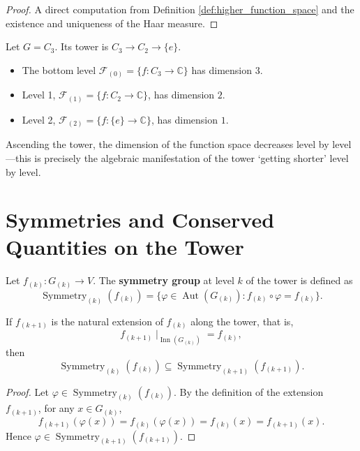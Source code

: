 \begin{proof}
A direct computation from Definition \ref{def:higher_function_space} and the existence and uniqueness of the Haar measure.
\end{proof}

\begin{example}\label{ex:c3_tower_functions}
Let $G=C_3$. Its tower is $C_3\to C_2\to\{e\}$.
\begin{itemize}
    \item The bottom level $\mathcal{F}_{(0)} = \{f: C_3\to\mathbb{C}\}$ has dimension $3$.
    \item Level 1, $\mathcal{F}_{(1)} = \{f: C_2\to\mathbb{C}\}$, has dimension $2$.
    \item Level 2, $\mathcal{F}_{(2)} = \{f: \{e\}\to\mathbb{C}\}$, has dimension $1$.
\end{itemize}
Ascending the tower, the dimension of the function space decreases level by level---this is precisely the algebraic manifestation of the tower `getting shorter' level by level.
\end{example}

\section{Symmetries and Conserved Quantities on the Tower}

\begin{definition}\label{def:higher_symmetry_group}
Let $f_{(k)}: G_{(k)}\to V$. The \textbf{symmetry group} at level $k$ of the tower is defined as
\[
\operatorname{Symmetry}_{(k)}(f_{(k)}) = \{\varphi\in\operatorname{Aut}(G_{(k)}) : f_{(k)}\circ\varphi = f_{(k)}\}.
\]
\end{definition}

\begin{proposition}
\label{prop:higher_symmetry_inclusion}
If $f_{(k+1)}$ is the natural extension of $f_{(k)}$ along the tower, that is,
\[
f_{(k+1)}\!\mid_{\operatorname{Inn}(G_{(k)})} = f_{(k)},
\]
then
\[
\operatorname{Symmetry}_{(k)}(f_{(k)})
\subseteq
\operatorname{Symmetry}_{(k+1)}(f_{(k+1)}).
\]
\end{proposition}

\begin{proof}
Let $\varphi\in\operatorname{Symmetry}_{(k)}(f_{(k)})$. By the definition of the extension $f_{(k+1)}$, for any $x\in G_{(k)}$,
\[
f_{(k+1)}(\varphi(x)) = f_{(k)}(\varphi(x)) = f_{(k)}(x) = f_{(k+1)}(x).
\]
Hence $\varphi\in\operatorname{Symmetry}_{(k+1)}(f_{(k+1)})$.
\end{proof}

